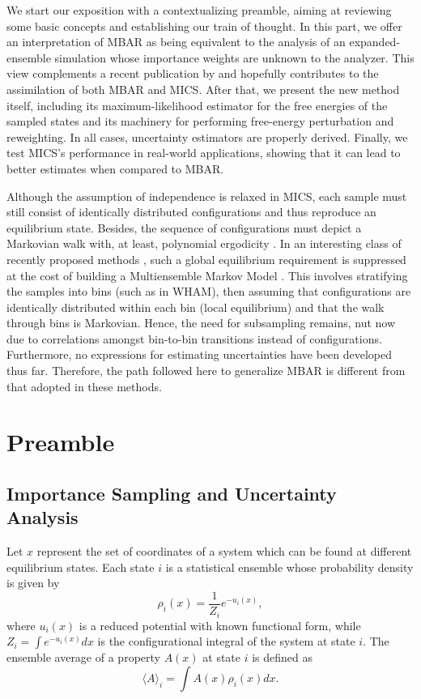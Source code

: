\documentclass[journal=jctcce,manuscript=article,layout=twocolumn]{achemso}
\begin{document}
We start our exposition with a contextualizing preamble, aiming at reviewing some basic concepts and establishing our train of thought. In this part, we offer an interpretation of MBAR as being equivalent to the analysis of an expanded-ensemble simulation \cite{Lyubartsev_1992} whose importance weights are unknown to the analyzer. This view complements a recent publication by \citeauthor{Shirts_2017} \cite{Shirts_2017} and hopefully contributes to the assimilation of both MBAR and MICS. After that, we present the new method itself, including its maximum-likelihood estimator for the free energies of the sampled states and its machinery for performing free-energy perturbation and reweighting. In all cases,  uncertainty estimators are properly derived. Finally, we test MICS's performance in real-world applications, showing that it can lead to better estimates when compared to MBAR.

Although the assumption of independence is relaxed in MICS, each sample must still consist of identically distributed configurations and thus reproduce an equilibrium state. Besides, the sequence of configurations must depict a Markovian walk with, at least, polynomial ergodicity \cite{Roy_2018}. In an interesting class of recently proposed methods \cite{Mey_2014, Wu_2014, Rosta_2015, Wu_2016}, such a global equilibrium requirement is suppressed at the cost of building a Multiensemble Markov Model \cite{Wu_2016}. This involves stratifying the samples into bins (such as in WHAM), then assuming that configurations are identically distributed within each bin (local equilibrium) and that the walk through bins is Markovian. Hence, the need for subsampling remains, nut now due to correlations amongst bin-to-bin transitions instead of configurations. Furthermore, no expressions for estimating uncertainties have been developed thus far. Therefore, the path followed here to generalize MBAR is different from that adopted in these methods.

\section{Preamble}

\subsection{Importance Sampling and Uncertainty Analysis}
\label{sec:definitions}

Let $x$ represent the set of coordinates of a system which can be found at different equilibrium states. Each state $i$ is a statistical ensemble whose probability density is given by
\begin{equation}
\label{eq:state_prob_density}
\rho_i(x) = \frac{1}{Z_i} e^{-u_i(x)},
\end{equation}
where $u_i(x)$ is a reduced potential \cite{Shirts_2008, Chodera_2011_2} with known functional form, while $Z_i = \int e^{-u_i(x)}dx$ is the configurational integral of the system at state $i$. The ensemble average of a property $A(x)$ at state $i$ is defined as
\begin{equation}
\label{eq:ensemble average}
\langle A \rangle_i = \int A(x)\rho_i(x)dx.
\end{equation}
\end{document}
